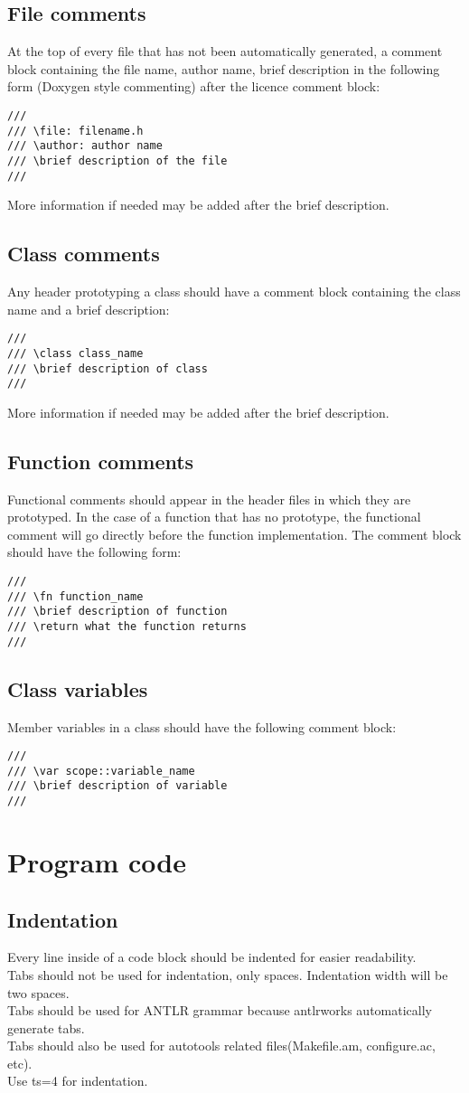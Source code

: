 \documentclass[letterpaper,10pt]{article}
\begin{document}
\subsection{File comments}
At the top of every file that has not been automatically generated, a comment block containing the file name, author name, brief description in the following form (Doxygen style commenting) after the licence comment block:
\begin{verbatim}
///
/// \file: filename.h
/// \author: author name
/// \brief description of the file
///
\end{verbatim}
More information if needed may be added after the brief description.
\subsection{Class comments}
Any header prototyping a class should have a comment block containing the class name and a brief description:
\begin{verbatim}
///
/// \class class_name
/// \brief description of class
///
\end{verbatim}
More information if needed may be added after the brief description.
\subsection{Function comments}
Functional comments should appear in the header files in which they are prototyped.  In the case of a function that has no prototype, the functional comment will go directly before the function implementation.  The comment block should have the following form:
\begin{verbatim}
///
/// \fn function_name
/// \brief description of function
/// \return what the function returns
///
\end{verbatim}
\subsection{Class variables}
Member variables in a class should have the following comment block:
\begin{verbatim}
///
/// \var scope::variable_name
/// \brief description of variable
///
\end{verbatim}
\section{Program code}
\subsection{Indentation}
Every line inside of a code block should be indented for easier readability.\\
Tabs should not be used for indentation, only spaces.  Indentation width will be two spaces. \\
Tabs should be used for ANTLR grammar because antlrworks automatically generate tabs. \\
Tabs should also be used for autotools related files(Makefile.am, configure.ac, etc). \\
Use ts=4 for indentation.
\end{document}
